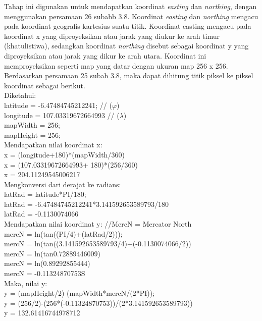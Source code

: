 Tahap ini digunakan untuk mendapatkan koordinat \textit{easting} dan \textit{northing}, dengan menggunakan persamaan 26 subabb 3.8. Koordinat \textit{easting} dan \textit{northing} mengacu pada koordinat geografis kartesius suatu titik. Koordinat easting mengacu pada koordinat x yang diproyeksikan atau jarak yang diukur ke arah timur (khatulistiwa), sedangkan koordinat \textit{northing} disebut sebagai koordinat y yang diproyeksikan atau jarak yang dikur ke arah utara. Koordinat ini memproyeksikan seperti map yang datar dengan ukuran map 256 x 256. Berdasarkan persamaan 25 subab 3.8, maka dapat dihitung titik piksel ke piksel koordinat sebagai berikut.\\
Diketahui: \\
latitude   	= -6.47484745212241; // ($\varphi$) \\
longitude      = 107.03319672664993 // ($\lambda$) \\
mapWidth    = 256; \\
mapHeight   = 256; \\
Mendapatkan nilai koordinat x:\\
\hspace{1,2cm} x = (longitude+180)*(mapWidth/360)\\
\hspace{1,2cm} x = (107.03319672664993+ 180)*(256/360)\\
\hspace{1,2cm}  x = 204.11249545006217\\
Mengkonversi dari derajat ke radians:\\
\hspace{1,2cm} latRad = latitude*PI/180;\\
\hspace{1,2cm} latRad = -6.47484745212241*3.141592653589793/180\\
\hspace{1,2cm} latRad = -0.1130074066 \\
Mendapatkan nilai koordinat y: //MercN = Mercator North\\
\hspace{1,2cm} mercN = ln(tan((PI/4)+(latRad/2)));\\
\hspace{1,2cm} mercN = ln(tan((3.141592653589793/4)+(-0.1130074066/2))\\
\hspace{1,2cm} mercN = ln(tan0.72889446009)\\
\hspace{1,2cm} mercN = ln(0.89292855444)\\
\hspace{1,2cm} mercN = -0.11324870753S\\
Maka, nilai y:\\
\hspace{1,2cm} y = (mapHeight/2)-(mapWidth*mercN/(2*PI));\\
\hspace{1,2cm} y = (256/2)-(256*(-0.11324870753))/(2*3.141592653589793))\\
\hspace{1,2cm} y = 132.61416744978712

